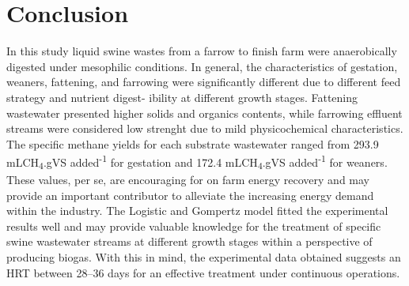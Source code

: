 \section{Conclusion}
In this study liquid swine wastes from a farrow to finish farm were anaerobically digested under mesophilic conditions. In general, the characteristics of gestation, weaners, fattening, and farrowing were significantly different due to different feed strategy and nutrient digest- ibility at different growth stages. Fattening wastewater presented higher solids and organics contents, while farrowing effluent streams were considered low strenght due to mild physicochemical characteristics. The specific methane yields for each substrate wastewater ranged from 293.9 mLCH\textsubscript{4}.gVS added\textsuperscript{-1} for gestation and 172.4 mLCH\textsubscript{4}.gVS added\textsuperscript{-1} for weaners. These values, per se, are encouraging for on farm energy recovery and may provide an important contributor to alleviate the increasing energy demand within the industry. The Logistic and Gompertz model fitted the experimental results well and may provide valuable knowledge for the treatment of specific swine wastewater streams at different growth stages within a perspective of producing biogas. With this in mind, the experimental data obtained suggests an HRT between 28–36 days for an effective treatment under continuous operations. 